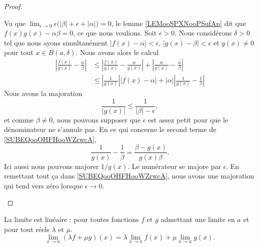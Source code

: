 \begin{proof}
\begin{subproof}
		Vu que \( \lim_{\epsilon\to 0}\epsilon\big( | \beta |+\epsilon+| \alpha | \big)=0\), le lemme \ref{LEMooSPXNooPSufAn} dit que \( f(x)g(x)-\alpha\beta=0\), ce que nous voulions.
		\spitem[Le quotient]
		Soit \( \epsilon>0\). Nous considérons \( \delta>0\) tel que nous ayons simultanément \( | f(x)-\alpha |<\epsilon\), \( | g(x)-\beta |<\epsilon\) et \( g(x)\neq 0\) pour tout \( x\in B(a,\delta)\). Nous avons alors le calcul
		\begin{subequations}
			\begin{align}
				| \frac{ f(x) }{ g(x) }-\frac{ \alpha }{ \beta } | & \leq | \frac{ f(x) }{ g(x) }-\frac{ \alpha }{ g(x) } |+| \frac{ \alpha }{ g(x) }-\frac{ \alpha }{ \beta } |            \\
				                                                   & \leq | \frac{1}{ g(x) } | |f(x)-\alpha |+| \alpha | |\frac{1}{ g(x) }-\frac{1}{ \beta } |  \label{SUBEQooOHFHooWZrwcA}
			\end{align}
		\end{subequations}
		Nous avons la majoration
		\begin{equation}
			\frac{1}{ | g(x) | }\leq \frac{1}{ | \beta |-\epsilon },
		\end{equation}
		et comme \( \beta\neq 0\), nous pouvons supposer que \( \epsilon\) est assez petit pour que le dénominateur ne s'annule pas. En ce qui concerne le second terme de \eqref{SUBEQooOHFHooWZrwcA},
		\begin{equation}
			\frac{1}{ g(x) }-\frac{1}{ \beta }=\frac{ \beta-g(x) }{ g(x)\beta }.
		\end{equation}
		Ici aussi nous pouvons majorer \( 1/g(x)\). Le numérateur se majore par \( \epsilon\). En remettant tout ça dans \eqref{SUBEQooOHFHooWZrwcA}, nous avons une majoration qui tend vers zéro lorsque \( \epsilon\to 0\).
	\end{subproof}
\end{proof}

\begin{proposition}     \label{PROPooVLBWooVttvFK}
	La limite est linéaire : pour toutes fonctions \( f\) et \( g\) admettant une limite en \( a\) et pour tout réels \( \lambda\) et \( \mu\).
	\begin{equation}
		\lim_{x\to a} (\lambda f+\mu g)(x)=\lambda\lim_{x\to a} f(x)+\mu\lim_{x\to a} g(x).
	\end{equation}
\end{proposition}

